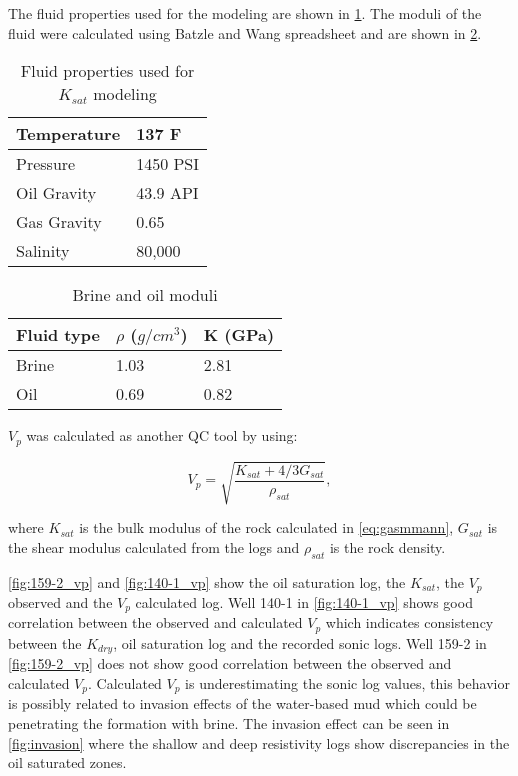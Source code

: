 The fluid properties used for the modeling are shown in \ref{tab:fluid}. The moduli
of the fluid were calculated using Batzle and Wang spreadsheet and are shown in \ref{tab:flag}. 


\begin{table}[h!]
\caption{Fluid properties used for $K_{sat}$ modeling \label{tab:fluid}}
\begin{center}
\begin{tabular}{ | l | l |}
\hline
Temperature      & 137 F  \\
\hline
Pressure      & 1450 PSI  \\
\hline
Oil Gravity & 43.9 API \\
\hline
Gas Gravity & 0.65 \\
\hline
Salinity & 80,000 \\
\hline
\end{tabular}
\end{center}
\end{table}


\begin{table}[h!]
\caption{Brine and oil moduli \label{tab:flag}}
\begin{center}
\begin{tabular}{ | l | l |l|}
\hline
Fluid type & $\rho$ ($g/cm^3$)& K (GPa) \\
\hline
Brine      &  1.03 & 2.81  \\
\hline
Oil      & 0.69 & 0.82   \\
\hline
\end{tabular}
\end{center}
\end{table}

$V_{p}$ was calculated as another QC tool by using:
 
\begin{equation}
V_{p}=\sqrt{\frac{K_{sat}+4/3 G_{sat}}{\rho_{sat}}}, 
  \label{eq:gassmann}
\end{equation}

where $K_{sat}$ is the bulk modulus of the rock calculated in \ref{eq:gasmmann}, $G_{sat}$ is the shear
modulus calculated from the logs and $\rho_{sat}$ is the rock density.


\ref{fig:159-2_vp} and \ref{fig:140-1_vp} show the oil saturation log, the $K_{sat}$, 
the $V_{p}$ observed and the $V_{p}$ calculated log. Well 140-1 in \ref{fig:140-1_vp}  shows good correlation
 between the observed and calculated $V_{p}$ which indicates consistency between the 
$K_{dry}$, oil saturation log and the recorded sonic logs. Well 159-2 in  \ref{fig:159-2_vp} 
does not show good correlation between the observed and calculated $V_{p}$. Calculated $V_{p}$ 
is underestimating the sonic log values, this behavior is possibly related to invasion effects of 
the water-based mud which could be penetrating the formation with brine. The invasion effect
can be seen in \ref{fig:invasion} where the shallow and deep resistivity logs show discrepancies
in the oil saturated zones.

